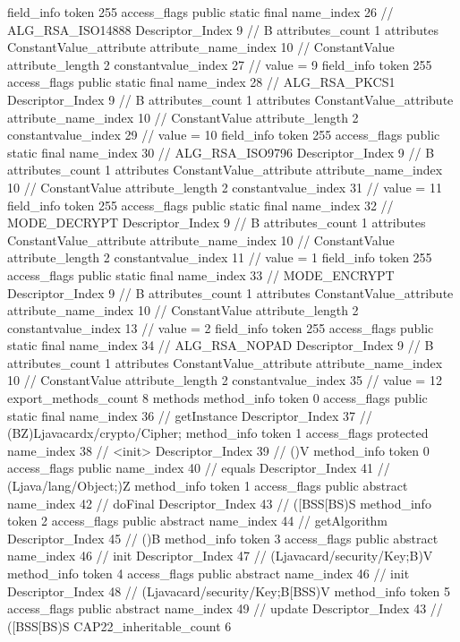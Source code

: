 {{{{			field_info {
				token	255
				access_flags	public static final
				name_index	26		// ALG_RSA_ISO14888
				Descriptor_Index	9		// B
				attributes_count	1
				attributes {
				ConstantValue_attribute {
					attribute_name_index	10		// ConstantValue
					attribute_length	2
					constantvalue_index	27		// value = 9
				}
				}
			}
			field_info {
				token	255
				access_flags	public static final
				name_index	28		// ALG_RSA_PKCS1
				Descriptor_Index	9		// B
				attributes_count	1
				attributes {
				ConstantValue_attribute {
					attribute_name_index	10		// ConstantValue
					attribute_length	2
					constantvalue_index	29		// value = 10
				}
				}
			}
			field_info {
				token	255
				access_flags	public static final
				name_index	30		// ALG_RSA_ISO9796
				Descriptor_Index	9		// B
				attributes_count	1
				attributes {
				ConstantValue_attribute {
					attribute_name_index	10		// ConstantValue
					attribute_length	2
					constantvalue_index	31		// value = 11
				}
				}
			}
			field_info {
				token	255
				access_flags	public static final
				name_index	32		// MODE_DECRYPT
				Descriptor_Index	9		// B
				attributes_count	1
				attributes {
				ConstantValue_attribute {
					attribute_name_index	10		// ConstantValue
					attribute_length	2
					constantvalue_index	11		// value = 1
				}
				}
			}
			field_info {
				token	255
				access_flags	public static final
				name_index	33		// MODE_ENCRYPT
				Descriptor_Index	9		// B
				attributes_count	1
				attributes {
				ConstantValue_attribute {
					attribute_name_index	10		// ConstantValue
					attribute_length	2
					constantvalue_index	13		// value = 2
				}
				}
			}
			field_info {
				token	255
				access_flags	public static final
				name_index	34		// ALG_RSA_NOPAD
				Descriptor_Index	9		// B
				attributes_count	1
				attributes {
				ConstantValue_attribute {
					attribute_name_index	10		// ConstantValue
					attribute_length	2
					constantvalue_index	35		// value = 12
				}
				}
			}
			}
			export_methods_count	8
			methods {
				method_info {
					token	0
					access_flags	public static final
					name_index	36		// getInstance
					Descriptor_Index	37		// (BZ)Ljavacardx/crypto/Cipher;
				}
				method_info {
					token	1
					access_flags	protected
					name_index	38		// <init>
					Descriptor_Index	39		// ()V
				}
				method_info {
					token	0
					access_flags	public
					name_index	40		// equals
					Descriptor_Index	41		// (Ljava/lang/Object;)Z
				}
				method_info {
					token	1
					access_flags	public abstract
					name_index	42		// doFinal
					Descriptor_Index	43		// ([BSS[BS)S
				}
				method_info {
					token	2
					access_flags	public abstract
					name_index	44		// getAlgorithm
					Descriptor_Index	45		// ()B
				}
				method_info {
					token	3
					access_flags	public abstract
					name_index	46		// init
					Descriptor_Index	47		// (Ljavacard/security/Key;B)V
				}
				method_info {
					token	4
					access_flags	public abstract
					name_index	46		// init
					Descriptor_Index	48		// (Ljavacard/security/Key;B[BSS)V
				}
				method_info {
					token	5
					access_flags	public abstract
					name_index	49		// update
					Descriptor_Index	43		// ([BSS[BS)S
				}
			}
			CAP22_inheritable_count	6
		}
	}
}
